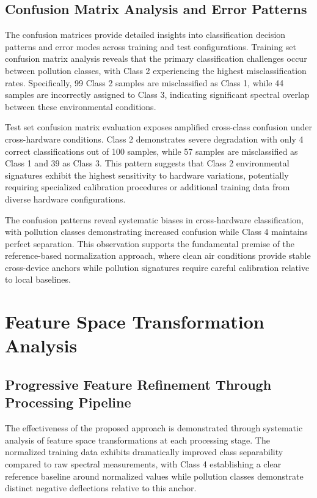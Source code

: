 \subsection{Confusion Matrix Analysis and Error Patterns}

The confusion matrices provide detailed insights into classification decision patterns and error modes across training and test configurations. Training set confusion matrix analysis reveals that the primary classification challenges occur between pollution classes, with Class 2 experiencing the highest misclassification rates. Specifically, 99 Class 2 samples are misclassified as Class 1, while 44 samples are incorrectly assigned to Class 3, indicating significant spectral overlap between these environmental conditions.

Test set confusion matrix evaluation exposes amplified cross-class confusion under cross-hardware conditions. Class 2 demonstrates severe degradation with only 4 correct classifications out of 100 samples, while 57 samples are misclassified as Class 1 and 39 as Class 3. This pattern suggests that Class 2 environmental signatures exhibit the highest sensitivity to hardware variations, potentially requiring specialized calibration procedures or additional training data from diverse hardware configurations.

The confusion patterns reveal systematic biases in cross-hardware classification, with pollution classes demonstrating increased confusion while Class 4 maintains perfect separation. This observation supports the fundamental premise of the reference-based normalization approach, where clean air conditions provide stable cross-device anchors while pollution signatures require careful calibration relative to local baselines.

\section{Feature Space Transformation Analysis}

\subsection{Progressive Feature Refinement Through Processing Pipeline}

The effectiveness of the proposed approach is demonstrated through systematic analysis of feature space transformations at each processing stage. The normalized training data exhibits dramatically improved class separability compared to raw spectral measurements, with Class 4 establishing a clear reference baseline around normalized values while pollution classes demonstrate distinct negative deflections relative to this anchor.

